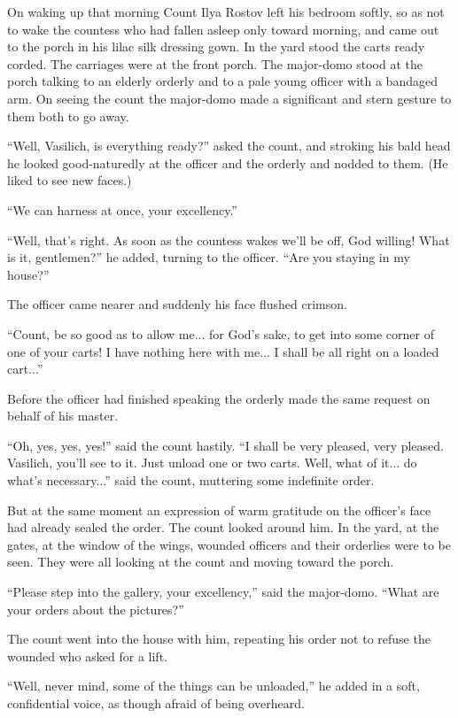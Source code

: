 On waking up that morning Count Ilya Rostov left his bedroom
softly, so as not to wake the countess who had fallen asleep only
toward morning, and came out to the porch in his lilac silk
dressing gown. In the yard stood the carts ready corded. The
carriages were at the front porch. The major-domo stood at the
porch talking to an elderly orderly and to a pale young officer
with a bandaged arm. On seeing the count the major-domo made a
significant and stern gesture to them both to go away.

``Well, Vasilich, is everything ready?'' asked the count, and
stroking his bald head he looked good-naturedly at the officer
and the orderly and nodded to them. (He liked to see new faces.)

``We can harness at once, your excellency.''

``Well, that's right. As soon as the countess wakes we'll be off,
God willing! What is it, gentlemen?'' he added, turning to the
officer. ``Are you staying in my house?''

The officer came nearer and suddenly his face flushed crimson.

``Count, be so good as to allow me... for God's sake, to get into
some corner of one of your carts! I have nothing here with
me... I shall be all right on a loaded cart...''

Before the officer had finished speaking the orderly made the
same request on behalf of his master.

``Oh, yes, yes, yes!'' said the count hastily. ``I shall be very
pleased, very pleased. Vasilich, you'll see to it. Just unload
one or two carts.  Well, what of it... do what's necessary...''
said the count, muttering some indefinite order.

But at the same moment an expression of warm gratitude on the
officer's face had already sealed the order. The count looked
around him. In the yard, at the gates, at the window of the
wings, wounded officers and their orderlies were to be seen. They
were all looking at the count and moving toward the porch.

``Please step into the gallery, your excellency,'' said the
major-domo.  ``What are your orders about the pictures?''

The count went into the house with him, repeating his order not
to refuse the wounded who asked for a lift.

``Well, never mind, some of the things can be unloaded,'' he
added in a soft, confidential voice, as though afraid of being
overheard.

